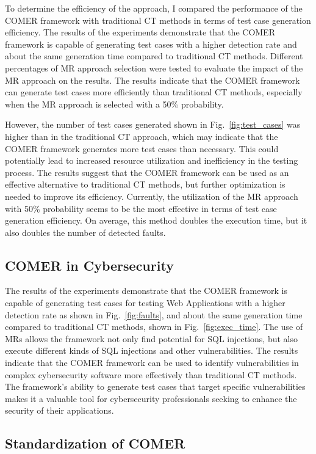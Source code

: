To determine the efficiency of the approach, I compared the performance of the COMER framework with traditional CT methods in terms of test case generation efficiency. The results of the experiments demonstrate that the COMER framework is capable of generating test cases with a higher detection rate and about the same generation time compared to traditional CT methods. Different percentages of MR approach selection were tested to evaluate the impact of the MR approach on the results. The results indicate that the COMER framework can generate test cases more efficiently than traditional CT methods, especially when the MR approach is selected with a 50\% probability.

However, the number of test cases generated shown in Fig.~\ref{fig:test_cases} was higher than in the traditional CT approach, which may indicate that the COMER framework generates more test cases than necessary. This could potentially lead to increased resource utilization and inefficiency in the testing process. The results suggest that the COMER framework can be used as an effective alternative to traditional CT methods, but further optimization is needed to improve its efficiency. Currently, the utilization of the MR approach with 50\% probability seems to be the most effective in terms of test case generation efficiency. On average, this method doubles the execution time, but it also doubles the number of detected faults.

\subsection{COMER in Cybersecurity}

The results of the experiments demonstrate that the COMER framework is capable of generating test cases for testing Web Applications with a higher detection rate as shown in Fig.~\ref{fig:faults}, and about the same generation time compared to traditional CT methods, shown in Fig.~\ref{fig:exec_time}. The use of MRs allows the framework not only find potential for SQL injections, but also execute different kinds of SQL injections and other vulnerabilities. The results indicate that the COMER framework can be used to identify vulnerabilities in complex cybersecurity software more effectively than traditional CT methods. The framework's ability to generate test cases that target specific vulnerabilities makes it a valuable tool for cybersecurity professionals seeking to enhance the security of their applications.

\subsection{Standardization of COMER}

